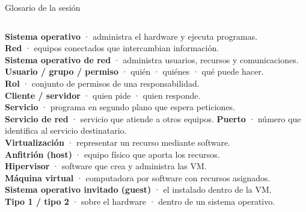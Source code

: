 \documentclass[aspectratio=169,10pt,c]{beamer}
\begin{document}
\begin{frame}{Glosario de la sesión\apoyo}
\begin{columns}[T,onlytextwidth]
\footnotesize
\textbf{Sistema operativo} · administra el hardware y ejecuta programas.\\[2pt]
\textbf{Red} · equipos conectados que intercambian información.\\[2pt]
\textbf{Sistema operativo de red} · administra usuarios, recursos y comunicaciones.\\[2pt]
\textbf{Usuario / grupo / permiso} · quién · quiénes · qué puede hacer.\\[2pt]
\textbf{Rol} · conjunto de permisos de una responsabilidad.\\[2pt]
\textbf{Cliente / servidor} · quien pide · quien responde.\\[2pt]
\textbf{Servicio} · programa en segundo plano que espera peticiones.\\[2pt]
\textbf{Servicio de red} · servicio que atiende a otros equipos.
\footnotesize
\textbf{Puerto} · número que identifica al servicio destinatario.\\[2pt]
\textbf{Virtualización} · representar un recurso mediante software.\\[2pt]
\textbf{Anfitrión (host)} · equipo físico que aporta los recursos.\\[2pt]
\textbf{Hipervisor} · software que crea y administra las VM.\\[2pt]
\textbf{Máquina virtual} · computadora por software con recursos asignados.\\[2pt]
\textbf{Sistema operativo invitado (guest)} · el instalado dentro de la VM.\\[2pt]
\textbf{Tipo 1 / tipo 2} · sobre el hardware · dentro de un sistema operativo.
\end{columns}
\end{frame}
\end{document}

